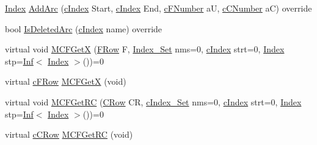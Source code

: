 \begin{DoxyCompactItemize}
\item 
\mbox{\hyperlink{class_m_c_f_class_ad53d6229d7ec28555a9c9c2fd9abf773}{Index}} \mbox{\hyperlink{class_m_c_f_simplex_a57e7641179f820974444701d4f179fb6}{Add\+Arc}} (\mbox{\hyperlink{class_m_c_f_class_a76aaabb20535c51a2752b93f6c38fe54}{c\+Index}} Start, \mbox{\hyperlink{class_m_c_f_class_a76aaabb20535c51a2752b93f6c38fe54}{c\+Index}} End, \mbox{\hyperlink{class_m_c_f_class_a11f747fbdff346237c8db4469d569994}{c\+F\+Number}} aU, \mbox{\hyperlink{class_m_c_f_class_a07dbefeeb08c3f63073622411893eb76}{c\+C\+Number}} aC) override
\item 
bool \mbox{\hyperlink{class_m_c_f_simplex_a303cdd3554fa6aa53098d080262d1e4b}{Is\+Deleted\+Arc}} (\mbox{\hyperlink{class_m_c_f_class_a76aaabb20535c51a2752b93f6c38fe54}{c\+Index}} name) override
\item 
virtual void \mbox{\hyperlink{class_m_c_f_simplex_a884f1180138ddf3df909347b1c85428c}{M\+C\+F\+GetX}} (\mbox{\hyperlink{class_m_c_f_class_a9dae1f1a39c208ce3c2b337cd5bb3d00}{F\+Row}} F, \mbox{\hyperlink{class_m_c_f_class_ace3388eb329ff0551a0b86b6c67e33d8}{Index\+\_\+\+Set}} nms=0, \mbox{\hyperlink{class_m_c_f_class_a76aaabb20535c51a2752b93f6c38fe54}{c\+Index}} strt=0, \mbox{\hyperlink{class_m_c_f_class_ad53d6229d7ec28555a9c9c2fd9abf773}{Index}} stp=\mbox{\hyperlink{class_o_p_ttypes__di__unipi__it_1_1_inf}{Inf}}$<$ \mbox{\hyperlink{class_m_c_f_class_ad53d6229d7ec28555a9c9c2fd9abf773}{Index}} $>$())=0
\item 
virtual \mbox{\hyperlink{class_m_c_f_class_ad325f3193dbba0ddef1da4e72d29eda6}{c\+F\+Row}} \mbox{\hyperlink{class_m_c_f_simplex_a4eb307e0707adaef99bb0e08c9e10eb8}{M\+C\+F\+GetX}} (void)
\item 
virtual void \mbox{\hyperlink{class_m_c_f_simplex_a361d84ae42041fdbf3824d45fc4c54aa}{M\+C\+F\+Get\+RC}} (\mbox{\hyperlink{class_m_c_f_class_a62409402be4e4b301e1a568f99f877be}{C\+Row}} CR, \mbox{\hyperlink{class_m_c_f_class_a81575b2d4e4d5636b17170432150ae69}{c\+Index\+\_\+\+Set}} nms=0, \mbox{\hyperlink{class_m_c_f_class_a76aaabb20535c51a2752b93f6c38fe54}{c\+Index}} strt=0, \mbox{\hyperlink{class_m_c_f_class_ad53d6229d7ec28555a9c9c2fd9abf773}{Index}} stp=\mbox{\hyperlink{class_o_p_ttypes__di__unipi__it_1_1_inf}{Inf}}$<$ \mbox{\hyperlink{class_m_c_f_class_ad53d6229d7ec28555a9c9c2fd9abf773}{Index}} $>$())=0
\item 
virtual \mbox{\hyperlink{class_m_c_f_class_ab700102e9ba8bb6015be6818d4e99097}{c\+C\+Row}} \mbox{\hyperlink{class_m_c_f_simplex_af027cee8179a876a4879c73820c380d1}{M\+C\+F\+Get\+RC}} (void)
\item 

\end{DoxyCompactItemize}
